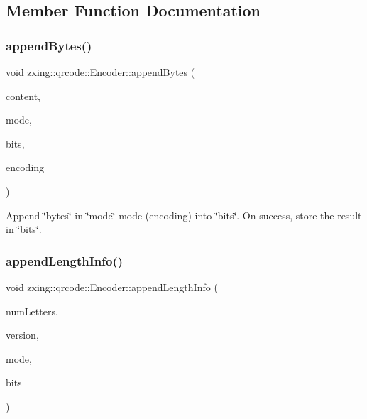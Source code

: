\subsection{Member Function Documentation}
\mbox{\label{classzxing_1_1qrcode_1_1_encoder_a433ec7881304bbc5e64ab52417f04ad8}} 
\subsubsection{\texorpdfstring{append\+Bytes()}{appendBytes()}}
{\footnotesize\ttfamily void zxing\+::qrcode\+::\+Encoder\+::append\+Bytes (\begin{DoxyParamCaption}\item[{const std\+::string \&}]{content,  }\item[{\mbox{\hyperlink{classzxing_1_1qrcode_1_1_mode}{Mode}} \&}]{mode,  }\item[{\mbox{\hyperlink{classzxing_1_1_bit_array}{Bit\+Array}} \&}]{bits,  }\item[{const std\+::string \&}]{encoding }\end{DoxyParamCaption})\hspace{0.3cm}{\ttfamily [static]}}

Append \char`\"{}bytes\char`\"{} in \char`\"{}mode\char`\"{} mode (encoding) into \char`\"{}bits\char`\"{}. On success, store the result in \char`\"{}bits\char`\"{}. \mbox{\label{classzxing_1_1qrcode_1_1_encoder_a49f0483c907f31535e9e55737b52305f}} 
\subsubsection{\texorpdfstring{append\+Length\+Info()}{appendLengthInfo()}}
{\footnotesize\ttfamily void zxing\+::qrcode\+::\+Encoder\+::append\+Length\+Info (\begin{DoxyParamCaption}\item[{int}]{num\+Letters,  }\item[{const \mbox{\hyperlink{classzxing_1_1qrcode_1_1_version}{Version}} \&}]{version,  }\item[{const \mbox{\hyperlink{classzxing_1_1qrcode_1_1_mode}{Mode}} \&}]{mode,  }\item[{\mbox{\hyperlink{classzxing_1_1_bit_array}{Bit\+Array}} \&}]{bits }\end{DoxyParamCaption})\hspace{0.3cm}{\ttfamily [static]}}


